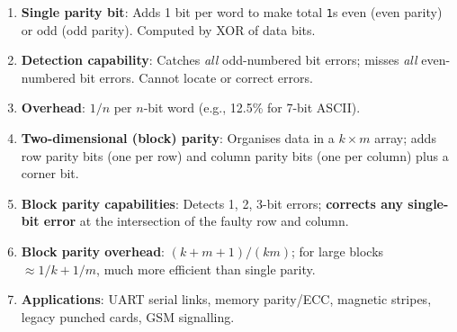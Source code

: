 \documentclass[11pt]{article}
\begin{document}
\begin{aretenir}
\begin{enumerate}
\item \textbf{Single parity bit}: Adds 1 bit per word to make total \texttt{1}s even (even parity) or odd (odd parity). Computed by XOR of data bits.
\item \textbf{Detection capability}: Catches \emph{all} odd-numbered bit errors; misses \emph{all} even-numbered bit errors. Cannot locate or correct errors.
\item \textbf{Overhead}: $1/n$ per $n$-bit word (e.g., 12.5\% for 7-bit ASCII).
\item \textbf{Two-dimensional (block) parity}: Organises data in a $k \times m$ array; adds row parity bits (one per row) and column parity bits (one per column) plus a corner bit.
\item \textbf{Block parity capabilities}: Detects 1, 2, 3-bit errors; \textbf{corrects any single-bit error} at the intersection of the faulty row and column.
\item \textbf{Block parity overhead}: $(k+m+1)/(km)$; for large blocks $\approx 1/k + 1/m$, much more efficient than single parity.
\item \textbf{Applications}: UART serial links, memory parity/ECC, magnetic stripes, legacy punched cards, GSM signalling.
\end{enumerate}
\end{aretenir}
\end{document}
